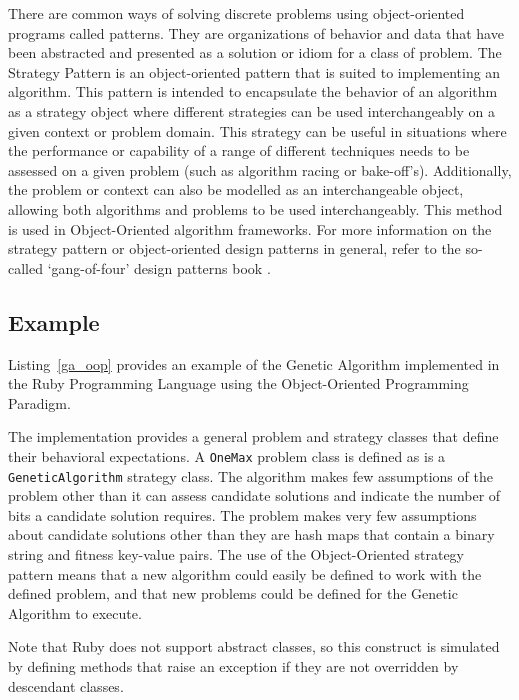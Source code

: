 \documentclass[a4paper, 11pt]{article}
\begin{document}
There are common ways of solving discrete problems using object-oriented programs called patterns. They are organizations of behavior and data that have been abstracted and presented as a solution or idiom for a class of problem. The Strategy Pattern is an object-oriented pattern that is suited to implementing an algorithm. This pattern is intended to encapsulate the behavior of an algorithm as a strategy object where different strategies can be used interchangeably on a given context or problem domain. This strategy can be useful in situations where the performance or capability of a range of different techniques needs to be assessed on a given problem (such as algorithm racing or bake-off's). Additionally, the problem or context can also be modelled as an interchangeable object, allowing both algorithms and problems to be used interchangeably. This method is used in Object-Oriented algorithm frameworks.
For more information on the strategy pattern or object-oriented design patterns in general, refer to the so-called `gang-of-four' design patterns book \cite{Gamma1995}.

\subsection{Example}
Listing~\ref{ga_oop} provides an example of the Genetic Algorithm implemented in the Ruby Programming Language using the Object-Oriented Programming Paradigm. 

The implementation provides a general problem and strategy classes that define their behavioral expectations. A \texttt{OneMax} problem class is defined as is a \texttt{GeneticAlgorithm} strategy class. The algorithm makes few assumptions of the problem other than it can assess candidate solutions and indicate the number of bits a candidate solution requires. The problem makes very few assumptions about candidate solutions other than they are hash maps that contain a binary string and fitness key-value pairs. The use of the Object-Oriented strategy pattern means that a new algorithm could easily be defined to work with the defined problem, and that new problems could be defined for the Genetic Algorithm to execute.

Note that Ruby does not support abstract classes, so this construct is simulated by defining methods that raise an exception if they are not overridden by descendant classes.


\end{document}
